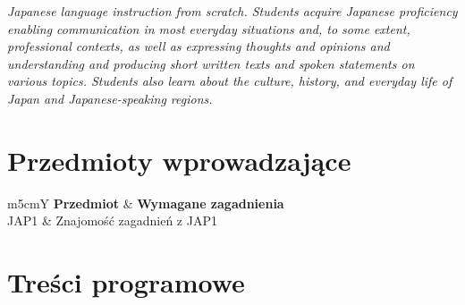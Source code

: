 \documentclass[12pt, a4paper]{article}
\newcommand{\thdrule}{\noalign{\global\setlength{\extrarowheight}{0pt}}}
\newcommand{\thdend}{\noalign{\global\setlength{\extrarowheight}{3pt}}}
\begin{document}
\textit{Japanese language instruction from scratch. Students acquire Japanese proficiency enabling communication in most everyday situations and, to some extent, professional contexts, as well as expressing thoughts and opinions and understanding and producing short written texts and spoken statements on various topics. Students also learn about the culture, history, and everyday life of Japan and Japanese-speaking regions.}


\section{Przedmioty wprowadzające}

{\scriptsize
\begin{tabularx}{\textwidth}{m{5cm}Y}
\thdrule\toprule
{} {\color{white}\textbf{Przedmiot}} & {\color{white}\textbf{Wymagane zagadnienia}} \\
\midrule\thdend
   JAP1 & Znajomość zagadnień z JAP1 \\
\bottomrule
\end{tabularx}}

\section{Treści programowe}
\end{document}
